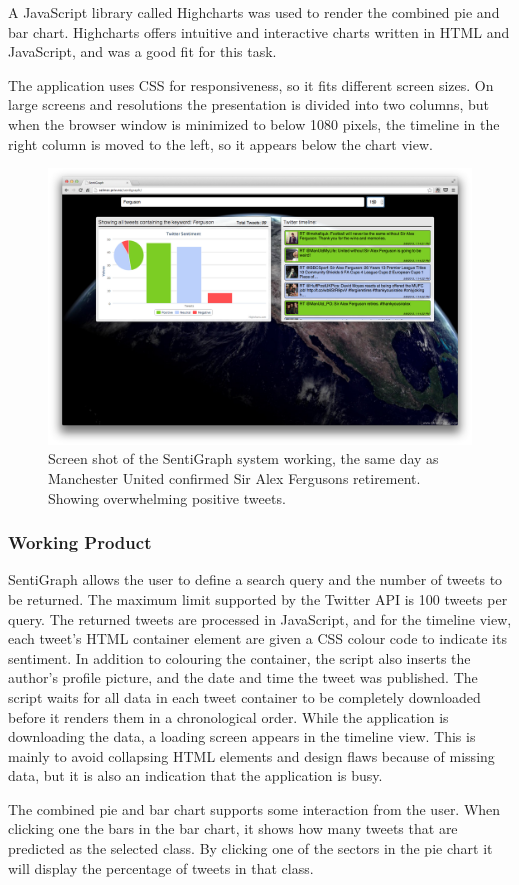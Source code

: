 A JavaScript library called Highcharts was used to render the combined pie and bar chart. Highcharts offers intuitive and interactive charts written in HTML and JavaScript, and was a good fit for this task. 

The application uses CSS for responsiveness, so it fits different screen sizes. On large screens and resolutions the presentation is divided into two columns, but when the browser window is minimized to below 1080 pixels, the timeline in the right column is moved to the left, so it appears below the chart view.

\begin{figure}[htb!]
\begin{center}
 \includegraphics[width=\textwidth]{../img/screenshot_sentigraph.png}
 \caption[SentiGraph screen shot]{Screen shot of the SentiGraph system working, the same day as Manchester United confirmed Sir Alex Fergusons retirement. Showing overwhelming positive tweets.}
 \label{fig:sentigraph_screenshot}
\end{center}
\end{figure}

\subsubsection{Working Product}

SentiGraph allows the user to define a search query and the number of tweets to be returned. The maximum limit supported by the Twitter API is 100 tweets per query. The returned tweets are processed in JavaScript, and for the timeline view, each tweet's HTML container element are given a CSS colour code to indicate its sentiment. In addition to colouring the container, the script also inserts the author's profile picture, and the date and time the tweet was published. The script waits for all data in each tweet container to be completely downloaded before it renders them in a chronological order. While the application is downloading the data, a loading screen appears in the timeline view. This is mainly to avoid collapsing HTML elements and design flaws because of missing data, but it is also an indication that the application is busy.

The combined pie and bar chart supports some interaction from the user. When clicking one the bars in the bar chart, it shows how many tweets that are predicted as the selected class. By clicking one of the sectors in the pie chart it will display the percentage of tweets in that class.

